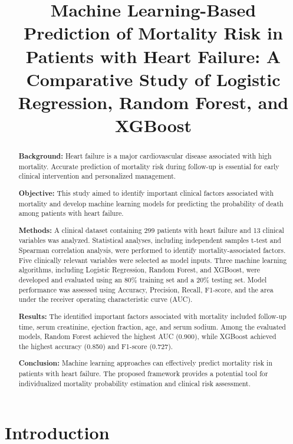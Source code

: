 \documentclass[11pt]{article}
\title{
Machine Learning-Based Prediction of Mortality Risk in Patients with Heart Failure:
A Comparative Study of Logistic Regression, Random Forest, and XGBoost
}
\author{
}
\date{}
\begin{document}
\maketitle


\begin{abstract}

\textbf{Background:}
Heart failure is a major cardiovascular disease associated with high mortality.
Accurate prediction of mortality risk during follow-up is essential for early
clinical intervention and personalized management.

\textbf{Objective:}
This study aimed to identify important clinical factors associated with mortality
and develop machine learning models for predicting the probability of death among
patients with heart failure.

\textbf{Methods:}
A clinical dataset containing 299 patients with heart failure and 13 clinical
variables was analyzed. Statistical analyses, including independent samples
t-test and Spearman correlation analysis, were performed to identify
mortality-associated factors. Five clinically relevant variables were selected
as model inputs. Three machine learning algorithms, including Logistic Regression,
Random Forest, and XGBoost, were developed and evaluated using an 80\% training
set and a 20\% testing set. Model performance was assessed using Accuracy,
Precision, Recall, F1-score, and the area under the receiver operating
characteristic curve (AUC).

\textbf{Results:}
The identified important factors associated with mortality included follow-up
time, serum creatinine, ejection fraction, age, and serum sodium. Among the
evaluated models, Random Forest achieved the highest AUC (0.900), while XGBoost
achieved the highest accuracy (0.850) and F1-score (0.727).

\textbf{Conclusion:}
Machine learning approaches can effectively predict mortality risk in patients
with heart failure. The proposed framework provides a potential tool for
individualized mortality probability estimation and clinical risk assessment.

\end{abstract}



\section{Introduction}
\end{document}
